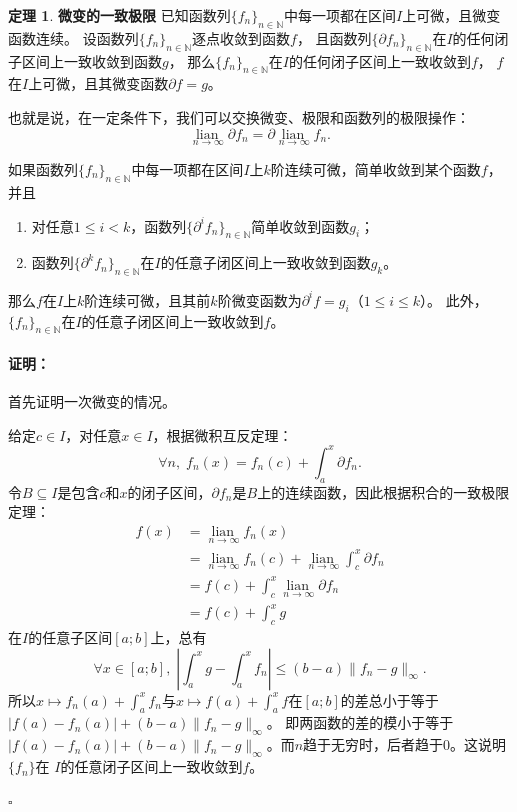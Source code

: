 \documentclass[12pt,UTF8]{ctexbook}
\newcommand{\lian}[1]{
    \underset{#1}{\operatorname{lian}\,}
}
\theoremstyle{definition}
\newtheorem{tm}{定理}[section]
\theoremstyle{plain}
\renewenvironment{proof}{\paragraph{\textbf{证明：}}}{\hfill$\square$}
\begin{document}
\begin{appendix}
\begin{tm}{\textbf{微变的一致极限}}
    已知函数列$\{f_n\}_{n\in\mathbb{N}}$中每一项都在区间$I$上可微，且微变函数连续。
    设函数列$\{f_n\}_{n\in\mathbb{N}}$逐点收敛到函数$f$，
    且函数列$\{\partial f_n\}_{n\in\mathbb{N}}$在$I$的任何闭子区间上一致收敛到函数$g$，
    那么$\{f_n\}_{n\in\mathbb{N}}$在$I$的任何闭子区间上一致收敛到$f$，
    $f$在$I$上可微，且其微变函数$\partial f = g$。

    也就是说，在一定条件下，我们可以交换微变、极限和函数列的极限操作：
    $$ \lian{n\to \infty} \partial f_n = \partial \lian{n\to \infty} f_n. $$

    如果函数列$\{f_n\}_{n\in\mathbb{N}}$中每一项都在区间$I$上$k$阶连续可微，简单收敛到某个函数$f$，并且
    \begin{enumerate}
        \item 对任意$1 \leqslant i < k$，函数列$\{\partial^i f_n\}_{n\in\mathbb{N}}$简单收敛到函数$g_i$；
        \item 函数列$\{\partial^k f_n\}_{n\in\mathbb{N}}$在$I$的任意子闭区间上一致收敛到函数$g_k$。
    \end{enumerate}
    那么$f$在$I$上$k$阶连续可微，且其前$k$阶微变函数为$\partial^i f = g_i$（$1 \leqslant i\leqslant k$）。
    此外，$\{f_n\}_{n\in\mathbb{N}}$在$I$的任意子闭区间上一致收敛到$f$。

\end{tm}

\begin{proof}
    首先证明一次微变的情况。
    
    给定$c\in I$，对任意$x\in I$，根据微积互反定理：
    $$ \forall n,\; f_n(x) = f_n(c) + \int_a^x \partial f_n. $$
    令$B\subseteq I$是包含$c$和$x$的闭子区间，$\partial f_n$是$B$上的连续函数，因此根据积合的一致极限定理：
    \begin{align*}
        f(x) &= \lian{n\to\infty} f_n(x) \\
        &= \lian{n\to\infty} f_n(c) + \lian{n\to\infty} \int_c^x \partial f_n \\
        &= f(c) + \int_c^x \lian{n\to\infty} \partial f_n \\
        &= f(c) + \int_c^x g
    \end{align*}
    在$I$的任意子区间$[a;b]$上，总有
    $$ \forall x \in [a;b], \; \left|\int_a^x g - \int_a^x f_n \right| \leqslant (b - a) \|f_n - g\|_{\infty}.$$
    所以$x\mapsto f_n(a) + \int_a^x f_n$与$x\mapsto f(a) + \int_a^x f$在$[a;b]$的差总小于等于$|f(a) - f_n(a)| + (b - a) \|f_n - g\|_{\infty}$。
    即两函数的差的模小于等于$|f(a) - f_n(a)| + (b - a) \|f_n - g\|_{\infty}$。而$n$趋于无穷时，后者趋于$0$。这说明$\{f_n\}$在
    $I$的任意闭子区间上一致收敛到$f$。


\end{proof}
\end{appendix}
\end{document}
